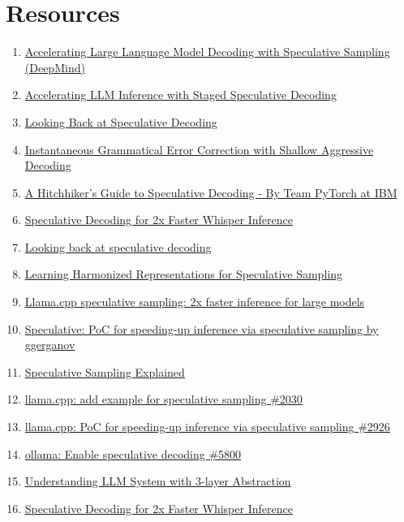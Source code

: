 \documentclass[a4paper,12pt]{report}
\begin{document}
\section*{Resources}
\begin{enumerate}
    \item \href{https://arxiv.org/abs/2302.01318}{Accelerating Large Language Model Decoding with Speculative Sampling (DeepMind)}
    \item \href{https://arxiv.org/abs/2308.04623}{Accelerating LLM Inference with Staged Speculative Decoding}
    \item \href{https://news.ycombinator.com/item?id=43216518}{Looking Back at Speculative Decoding}
    \item \href{https://arxiv.org/abs/2106.04970}{Instantaneous Grammatical Error Correction with Shallow Aggressive Decoding}
    \item \href{https://pytorch.org/blog/hitchhikers-guide-speculative-decoding/}{A Hitchhiker’s Guide to Speculative Decoding - By Team PyTorch at IBM}
    \item \href{https://colab.research.google.com/github/sanchit-gandhi/notebooks/blob/main/speculative_decoding.ipynb#scrollTo=baf87589-b7fe-45dd-a6f6-9b9223581562}{Speculative Decoding for 2x Faster Whisper Inference}
    \item \href{https://research.google/blog/looking-back-at-speculative-decoding/}{Looking back at speculative decoding}
    \item \href{https://arxiv.org/abs/2408.15766}{Learning Harmonized Representations for Speculative Sampling}
    \item \href{https://news.ycombinator.com/item?id=37390024}{Llama.cpp speculative sampling: 2x faster inference for large models}
    \item \href{https://news.ycombinator.com/item?id=37357783}{Speculative: PoC for speeding-up inference via speculative sampling by ggerganov}
    \item \href{https://saibo-creator.github.io/post/2024_03_08_speculative_sampling/}{Speculative Sampling Explained}
    \item \href{https://github.com/ggml-org/llama.cpp/issues/2030}{llama.cpp: add example for speculative sampling \#2030}
    \item \href{https://github.com/ggml-org/llama.cpp/pull/2926}{llama.cpp: PoC for speeding-up inference via speculative sampling \#2926}
    \item \href{https://github.com/ollama/ollama/issues/5800}{ollama: Enable speculative decoding \#5800}
    \item \href{https://ralphmao.github.io/ML-software-system/}{Understanding LLM System with 3-layer Abstraction}
    \item \href{https://huggingface.co/blog/whisper-speculative-decoding}{Speculative Decoding for 2x Faster Whisper Inference}
\end{enumerate}
\end{document}
